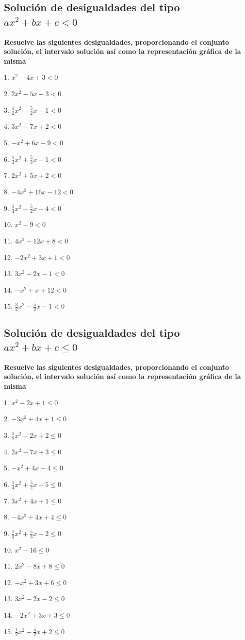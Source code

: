 \documentclass[]{book}
\begin{document}
\subsection{\texorpdfstring{Solución de desigualdades del tipo
\(ax^2+bx+c<0\)}{Solución de desigualdades del tipo ax\^{}2+bx+c\textless{}0}}\label{soluciuxf3n-de-desigualdades-del-tipo-ax2bxc0-1}

\textbf{Resuelve las siguientes desigualdades, proporcionando el
conjunto solución, el intervalo solución así como la representación
gráfica de la misma}

\begin{multicols}{3}
1. $x^2-4x+3<0$

2. $2x^2-5x-3<0$

3. $\frac{1}{2}x^2-\frac{5}{2}x+1<0$

4. $3x^2-7x+2<0$

5. $-x^2+6x-9<0$

6. $\frac{1}{3}x^2+\frac{5}{3}x+1<0$

7. $2x^2+5x+2<0$

8. $-4x^2+16x-12<0$

9. $\frac{1}{4}x^2-\frac{5}{2}x+4<0$

10. $x^2-9<0$

11. $4x^2-12x+8<0$

12. $-2x^2+3x+1<0$

13. $3x^2-2x-1<0$

14. $-x^2+x+12<0$

15. $\frac{3}{2}x^2-\frac{5}{2}x-1<0$
\end{multicols}

\subsection{\texorpdfstring{Solución de desigualdades del tipo
\(ax^2+bx+c\leq 0\)}{Solución de desigualdades del tipo ax\^{}2+bx+c\textbackslash{}leq 0}}\label{soluciuxf3n-de-desigualdades-del-tipo-ax2bxcleq-0}

\textbf{Resuelve las siguientes desigualdades, proporcionando el
conjunto solución, el intervalo solución así como la representación
gráfica de la misma}

\begin{multicols}{3}
1. $x^2-2x+1\leq0$

2. $-3x^2+4x+1\leq0$

3. $\frac{1}{2}x^2-2x+2\leq0$

4. $2x^2-7x+3\leq0$

5. $-x^2+4x-4\leq0$

6. $\frac{1}{4}x^2+\frac{5}{2}x+5\leq0$

7. $3x^2+4x+1\leq0$

8. $-4x^2+4x+4\leq0$

9. $\frac{1}{3}x^2+\frac{5}{3}x+2\leq0$

10. $x^2-16\leq0$

11. $2x^2-8x+8\leq0$

12. $-x^2+3x+6\leq0$

13. $3x^2-2x-2\leq0$

14. $-2x^2+3x+3\leq0$

15. $\frac{1}{2}x^2-\frac{5}{2}x+2\leq0$
\end{multicols}
\end{document}

